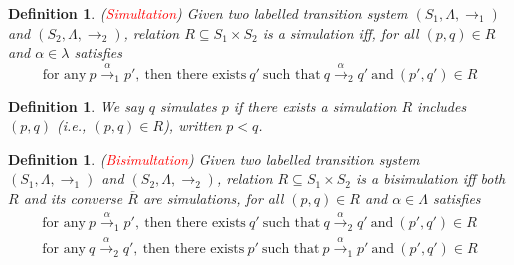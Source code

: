 \documentclass{article}
\newtheorem{lemma}[theorem]{Lemma}
\newtheorem{definition}[theorem]{Definition}
\newcommand{\redt}[1]{\textcolor{red}{#1}}
\begin{document}
\begin{definition}
\rm (\redt{Simultation}) Given two labelled transition system $(S_1, \Lambda, \to_1)$ and $(S_2, \Lambda, \to_2)$, relation $R \subseteq S_1 \times S_2$ is a simulation iff, for all $(p,q) \in R$ and $\alpha \in \lambda$ satisfies
\[
	\text{for any}~p \xrightarrow{\alpha}_1 p', ~\text{then there exists}~ q'~\text{such that}~q \xrightarrow{\alpha}_2 q'~\text{and}~(p',q') \in R 	
\]
\begin{center}
\end{center}
\end{definition}

\begin{definition}
\rm We say $q$ simulates $p$ if there exists a simulation $R$ includes $(p,q)$ (i.e., $(p,q) \in R$), written $p < q$.
\end{definition}



\begin{definition}
\rm (\redt{Bisimultation}) Given two labelled transition system $(S_1, \Lambda, \to_1)$ and $(S_2, \Lambda, \to_2)$, relation $R \subseteq S_1 \times S_2$ is a bisimulation iff both $R$ and its converse $\overline{R}$ are simulations, for all $(p,q) \in R$ and $\alpha \in \Lambda$ satisfies
\[
	\begin{gathered}
	\text{for any}~p \xrightarrow{\alpha}_1 p', ~\text{then there exists}~ q'~\text{such that}~q \xrightarrow{\alpha}_2 q'~\text{and}~(p',q') \in R \\
	\text{for any}~q \xrightarrow{\alpha}_2 q', ~\text{then there exists}~ p'~\text{such that}~p \xrightarrow{\alpha}_1 p'~\text{and}~(p',q') \in R
	\end{gathered} 	
\]
\end{definition}
\end{document}
